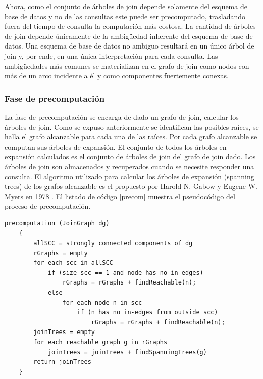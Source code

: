 Ahora, como el conjunto de \'arboles de join depende solamente del esquema de base de datos y no de las consultas
este puede ser precomputado, trasladando fuera del tiempo de consulta la computación m\'as costosa. La cantidad
de \'arboles de join depende \'unicamente de la ambigüedad inherente del esquema de base de datos. Una esquema 
de base de datos no ambiguo resultar\'a en un único \'arbol de join y, por ende, en una \'unica interpretación 
para cada consulta. Las ambigüedades m\'as comunes se materializan en el grafo de join como nodos con m\'as de 
un arco incidente a \'el y como componentes fuertemente conexas.

\subsubsection{Fase de precomputaci\'on}

La fase de precomputaci\'on se encarga de dado un grafo de join, calcular los \'arboles de join. Como se expuso 
anteriormente se identifican las posibles ra\'ices, se halla el grafo alcanzable para cada una de las ra\'ices. 
Por cada grafo alcanzable se computan sus \'arboles de expansión. El conjunto de todos los \'arboles en 
expansión calculados es el conjunto de \'arboles de join del grafo de join dado. Los \'arboles de join 
son almacenados y recuperados cuando se necesite responder una consulta. El algoritmo utilizado para calcular 
los \'arboles de expansión (spanning trees) de los grafos alcanzable es el propuesto por Harold N. Gabow y 
Eugene W. Myers en 1978 \cite{gabow1978finding}. El listado de código \ref{precom} muestra el pseudoc\'odigo 
del proceso de precomputaci\'on.

\begin{lstlisting}[label={precom}, caption={Pseudoc\'odigo del proceso de precomputaci\'on}]
    precomputation (JoinGraph dg)
    {
        allSCC = strongly connected components of dg
        rGraphs = empty
        for each scc in allSCC
            if (size scc == 1 and node has no in-edges)
                rGraphs = rGraphs + findReachable(n);
            else
                for each node n in scc
                    if (n has no in-edges from outside scc)
                        rGraphs = rGraphs + findReachable(n);
        joinTrees = empty
        for each reachable graph g in rGraphs
            joinTrees = joinTrees + findSpanningTrees(g)
        return joinTrees
    }
\end{lstlisting}

